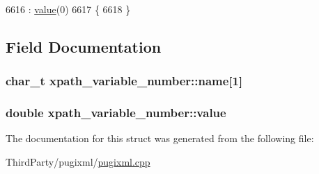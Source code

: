 \begin{DoxyCode}
6616                                : \hyperlink{structxpath__variable__number_a49949397348e7c941d88a694ec5c8e57}{value}(0)
6617         \{
6618         \}
\end{DoxyCode}


\subsection{Field Documentation}
\hypertarget{structxpath__variable__number_a2bf4163dab1a8e233d45677fee987f0f}{
\subsubsection[{name}]{\setlength{\rightskip}{0pt plus 5cm}char\-\_\-t xpath\-\_\-variable\-\_\-number\-::name\mbox{[}1\mbox{]}}}\label{structxpath__variable__number_a2bf4163dab1a8e233d45677fee987f0f}
\hypertarget{structxpath__variable__number_a49949397348e7c941d88a694ec5c8e57}{
\subsubsection[{value}]{\setlength{\rightskip}{0pt plus 5cm}double xpath\-\_\-variable\-\_\-number\-::value}}\label{structxpath__variable__number_a49949397348e7c941d88a694ec5c8e57}


The documentation for this struct was generated from the following file\-:\begin{DoxyCompactItemize}
\item 
Third\-Party/pugixml/\hyperlink{pugixml_8cpp}{pugixml.\-cpp}\end{DoxyCompactItemize}
